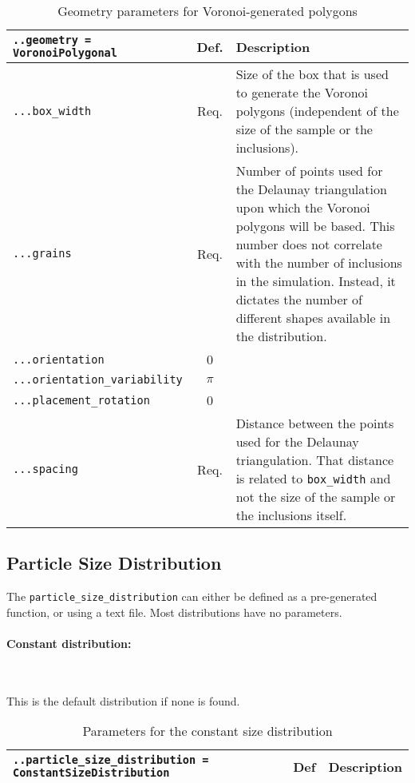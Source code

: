 \documentclass[10pt]{article}
\newcommand{\whiteline}{\textcolor{white}{.\\}}
\begin{document}
\begin{table}[h!]
\begin{tabularx}{\textwidth}{lcX}
\verb+..geometry = VoronoiPolygonal+ & Def. & Description\\
\hline
\verb+...box_width+ & Req. & Size of the box that is used to generate the Voronoi polygons (independent of the size of the sample or the inclusions).\\
\verb+...grains+ & Req. & Number of points used for the Delaunay triangulation upon which the Voronoi polygons will be based. This number does not correlate with the number of inclusions in the simulation. Instead, it dictates the number of different shapes available in the distribution.\\
\verb+...orientation+ & 0 & \\
\verb+...orientation_variability+ & $\pi$ & \\
\verb+...placement_rotation+ & 0 & \\
\verb+...spacing+ & Req. & Distance between the points used for the Delaunay triangulation. That distance is related to \verb+box_width+ and not the size of the sample or the inclusions itself. \\
\hline
\end{tabularx}
\caption{Geometry parameters for Voronoi-generated polygons}
\end{table}

\subsection{Particle Size Distribution}

The \verb+particle_size_distribution+ can either be defined as a pre-generated function, or using a text file.
Most distributions have no parameters.

\paragraph{Constant distribution:} \whiteline

This is the default distribution if none is found.

\begin{table}[h!]
\begin{tabularx}{\textwidth}{lcX}
\verb+..particle_size_distribution = ConstantSizeDistribution+ & Def & Description \\
\hline
\end{tabularx}
\caption{Parameters for the constant size distribution}
\end{table}
\end{document}

